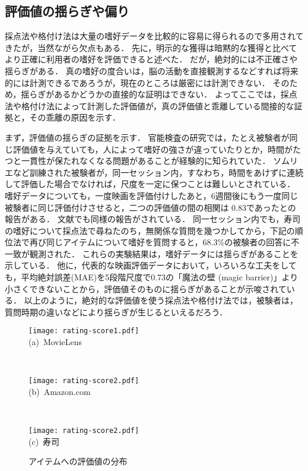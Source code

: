 \subsection{評価値の揺らぎや偏り}

採点法や格付け法は大量の嗜好データを比較的に容易に得られるので多用されてきたが，当然ながら欠点もある．
先に，明示的な獲得は暗黙的な獲得と比べてより正確に利用者の嗜好を評価できると述べた．
だが，絶対的には不正確さや揺らぎがある．
真の嗜好の度合いは，脳の活動を直接観測するなどすれば将来的には計測できるであろうが，現在のところは厳密には計測できない．
そのため，揺らぎがあるかどうかの直接的な証明はできない．
よってここでは，採点法や格付け法によって計測した評価値が，真の評価値と乖離している間接的な証拠と，その乖離の原因を示す．

まず，評価値の揺らぎの証拠を示す．
官能検査の研究では，たとえ被験者が同じ評価値を与えていても，人によって嗜好の強さが違っていたりとか，時間がたつと一貫性が保たれなくなる問題があることが経験的に知られていた\cite{lncs:04:01}．
ソムリエなど訓練された被験者が，同一セッション内，すなわち，時間をあけずに連続して評価した場合でなければ，尺度を一定に保つことは難しいとされている．
嗜好データについても，一度映画を評価付けしたあと，6週間後にもう一度同じ被験者に同じ評価付けさせると，二つの評価値の間の相関は
0.83であったとの報告がある\cite{sigchi:95:01}．
文献\cite{sigchi:03:02}でも同様の報告がされている．
同一セッション内でも，寿司の嗜好について採点法で尋ねたのち，無関係な質問を幾つかしてから，下記の順位法で再び同じアイテムについて嗜好を質問すると，68.3\%の被験者の回答に不一致が観測された\cite{jpublist:043}．
これらの実験結果は，嗜好データには揺らぎがあることを示している．
他に，代表的な映画評価データにおいて，いろいろな工夫をしても，平均絶対誤差(MAE)を5段階尺度で0.73の「魔法の壁 (magic barrier)」より小さくできないことから，評価値そのものに揺らぎがあることが示唆されている\cite{jacm:04:01}．
以上のように，絶対的な評価値を使う採点法や格付け法では，被験者は，質問時期の違いなどにより揺らぎが生じるといえるだろう．

\begin{figure}
\centering
\begin{minipage}{0.6\fullwidth}
\centering
\texttt{[image: rating-score1.pdf]}\\
(a)~MovieLens \cite{url:008}
\end{minipage}\\\medskip
\begin{minipage}{0.6\fullwidth}
\centering
\texttt{[image: rating-score2.pdf]}\\
(b)~Amazon.com \cite{misc:007}
\end{minipage}\\\medskip
\begin{minipage}{0.6\fullwidth}
\centering
\texttt{[image: rating-score2.pdf]}\\
(c)~寿司 \cite{url:020,epublist:064}
\end{minipage}
\caption{アイテムへの評価値の分布}
\label{fig:prefdist}
\end{figure}

